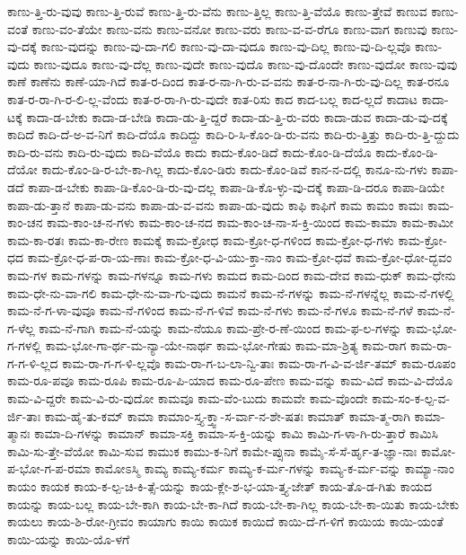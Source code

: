 {ಕಾಣು-ತ್ತಿ-ರು-ವುವು
ಕಾಣು-ತ್ತಿ-ರುವೆ
ಕಾಣು-ತ್ತಿ-ರು-ವೆನು
ಕಾಣು-ತ್ತಿಲ್ಲ
ಕಾಣು-ತ್ತಿ-ವೆಯೊ
ಕಾಣು-ತ್ತೇವೆ
ಕಾಣುವ
ಕಾಣು-ವಂತೆ
ಕಾಣು-ವಂ-ತೆಯೇ
ಕಾಣು-ವನು
ಕಾಣು-ವನೋ
ಕಾಣು-ವರು
ಕಾಣು-ವ-ವ-ರೆಗೂ
ಕಾಣು-ವಾಗ
ಕಾಣುವು
ಕಾಣು-ವು-ದಕ್ಕೆ
ಕಾಣು-ವುದನ್ನು
ಕಾಣು-ವು-ದಾ-ಗಲಿ
ಕಾಣು-ವು-ದಾ-ವುದೂ
ಕಾಣು-ವು-ದಿಲ್ಲ
ಕಾಣು-ವು-ದಿ-ಲ್ಲವೊ
ಕಾಣು-ವುದು
ಕಾಣು-ವುದೂ
ಕಾಣು-ವು-ದೆಲ್ಲ
ಕಾಣು-ವುದೇ
ಕಾಣು-ವುದೊ
ಕಾಣು-ವು-ದೊಂದೇ
ಕಾಣು-ವುದೋ
ಕಾಣು-ವುವು
ಕಾಣೆ
ಕಾಣೆನು
ಕಾಣೆ-ಯಾ-ಗಿದೆ
ಕಾತ-ರ-ದಿಂದ
ಕಾತ-ರ-ನಾ-ಗಿ-ರು-ವ-ವನು
ಕಾತ-ರ-ನಾ-ಗಿ-ರು-ವು-ದಿಲ್ಲ
ಕಾತ-ರನೂ
ಕಾತ-ರ-ರಾ-ಗಿ-ರ-ಲಿ-ಲ್ಲ-ವೆಂದು
ಕಾತ-ರ-ರಾ-ಗಿ-ರು-ವುದೇ
ಕಾತ-ರಿಸು
ಕಾದ
ಕಾದ-ಬಲ್ಲ
ಕಾದ-ಲ್ಲದೆ
ಕಾದಾಟ
ಕಾದಾ-ಟಕ್ಕೆ
ಕಾದಾ-ಡ-ಬೇಕು
ಕಾದಾ-ಡ-ಬೇಡಿ
ಕಾದಾ-ಡು-ತ್ತಿ-ದ್ದರೆ
ಕಾದಾ-ಡು-ತ್ತಿ-ರು-ವರು
ಕಾದಾ-ಡುವ
ಕಾದಾ-ಡು-ವು-ದಕ್ಕೆ
ಕಾದಿದೆ
ಕಾದಿ-ದೆ-ಅ-ವ-ನಿಗೆ
ಕಾದಿ-ದೆಯೊ
ಕಾದಿದ್ದು
ಕಾದಿ-ರಿ-ಸಿ-ಕೊಂ-ಡಿ-ರು-ವನು
ಕಾದಿ-ರು-ತ್ತಿತ್ತು
ಕಾದಿ-ರು-ತ್ತಿ-ದ್ದುದು
ಕಾದಿ-ರು-ವನು
ಕಾದಿ-ರು-ವುದು
ಕಾದಿ-ವೆಯೊ
ಕಾದು
ಕಾದು-ಕೊಂ-ಡಿದೆ
ಕಾದು-ಕೊಂ-ಡಿ-ದೆಯೊ
ಕಾದು-ಕೊಂ-ಡಿ-ದೆಯೋ
ಕಾದು-ಕೊಂ-ಡಿ-ರ-ಬೇ-ಕಾ-ಗಿಲ್ಲ
ಕಾದು-ಕೊಂ-ಡಿರು
ಕಾದು-ಕೊಂ-ಡಿವೆ
ಕಾನ-ನ-ದಲ್ಲಿ
ಕಾನೂ-ನು-ಗಳು
ಕಾಪಾ-ಡದೆ
ಕಾಪಾ-ಡ-ಬೇಕು
ಕಾಪಾ-ಡಿ-ಕೊಂ-ಡಿ-ರು-ವು-ದಲ್ಲ
ಕಾಪಾ-ಡಿ-ಕೊ-ಳ್ಳು-ವು-ದಕ್ಕೆ
ಕಾಪಾ-ಡಿ-ದರೂ
ಕಾಪಾ-ಡಿಯೇ
ಕಾಪಾ-ಡು-ತ್ತಾನೆ
ಕಾಪಾ-ಡು-ವನು
ಕಾಪಾ-ಡು-ವ-ವನು
ಕಾಪಾ-ಡು-ವುದು
ಕಾಫಿ
ಕಾಫಿಗೆ
ಕಾಮ
ಕಾಮಂ
ಕಾಮಃ
ಕಾಮ-ಕಾಂ-ಚನ
ಕಾಮ-ಕಾಂ-ಚ-ನ-ಗಳು
ಕಾಮ-ಕಾಂ-ಚ-ನದ
ಕಾಮ-ಕಾಂ-ಚ-ನಾ-ಸ-ಕ್ತಿ-ಯಿಂದ
ಕಾಮ-ಕಾಮಾ
ಕಾಮ-ಕಾಮೀ
ಕಾಮ-ಕಾ-ರತಃ
ಕಾಮ-ಕಾ-ರೇಣ
ಕಾಮಕ್ಕೆ
ಕಾಮ-ಕ್ರೋಧ
ಕಾಮ-ಕ್ರೋ-ಧ-ಗಳಿಂದ
ಕಾಮ-ಕ್ರೋ-ಧ-ಗಳು
ಕಾಮ-ಕ್ರೋ-ಧದ
ಕಾಮ-ಕ್ರೋ-ಧ-ಪ-ರಾ-ಯ-ಣಾಃ
ಕಾಮ-ಕ್ರೋ-ಧ-ವಿ-ಯು-ಕ್ತಾ-ನಾಂ
ಕಾಮ-ಕ್ರೋ-ಧವೆ
ಕಾಮ-ಕ್ರೋ-ಧೋ-ದ್ಭವಂ
ಕಾಮ-ಗಳ
ಕಾಮ-ಗಳನ್ನು
ಕಾಮ-ಗಳನ್ನೂ
ಕಾಮ-ಗಳು
ಕಾಮದ
ಕಾಮ-ದಿಂದ
ಕಾಮ-ದೇವ
ಕಾಮ-ಧುಕ್
ಕಾಮ-ಧೇನು
ಕಾಮ-ಧೇ-ನು-ವಾ-ಗಲಿ
ಕಾಮ-ಧೇ-ನು-ವಾ-ಗು-ವುದು
ಕಾಮನೆ
ಕಾಮ-ನೆ-ಗಳನ್ನು
ಕಾಮ-ನೆ-ಗಳನ್ನೆಲ್ಲ
ಕಾಮ-ನೆ-ಗಳಲ್ಲಿ
ಕಾಮ-ನೆ-ಗ-ಳಾ-ವುವೂ
ಕಾಮ-ನೆ-ಗಳಿಂದ
ಕಾಮ-ನೆ-ಗ-ಳಿವೆ
ಕಾಮ-ನೆ-ಗಳು
ಕಾಮ-ನೆ-ಗಳೂ
ಕಾಮ-ನೆ-ಗಳೆ
ಕಾಮ-ನೆ-ಗ-ಳೆಲ್ಲ
ಕಾಮ-ನೆ-ಗಾಗಿ
ಕಾಮ-ನೆ-ಯನ್ನು
ಕಾಮ-ನೆಯೂ
ಕಾಮ-ಪ್ರೇ-ರ-ಣೆ-ಯಿಂದ
ಕಾಮ-ಫ-ಲ-ಗಳನ್ನು
ಕಾಮ-ಭೋ-ಗ-ಗಳಲ್ಲಿ
ಕಾಮ-ಭೋ-ಗಾ-ರ್ಥ-ಮ-ನ್ಯಾ-ಯೇ-ನಾರ್ಥ
ಕಾಮ-ಭೋ-ಗೇಷು
ಕಾಮ-ಮಾ-ಶ್ರಿತ್ಯ
ಕಾಮ-ರಾಗ
ಕಾಮ-ರಾ-ಗ-ಗ-ಳಿ-ಲ್ಲದ
ಕಾಮ-ರಾ-ಗ-ಗ-ಳಿ-ಲ್ಲವೊ
ಕಾಮ-ರಾ-ಗ-ಬ-ಲಾ-ನ್ವಿ-ತಾಃ
ಕಾಮ-ರಾ-ಗ-ವಿ-ವ-ರ್ಜಿ-ತಮ್
ಕಾಮ-ರೂಪಂ
ಕಾಮ-ರೂ-ಪವೂ
ಕಾಮ-ರೂಪಿ
ಕಾಮ-ರೂ-ಪಿ-ಯಾದ
ಕಾಮ-ರೂ-ಪೇಣ
ಕಾಮ-ವನ್ನು
ಕಾಮ-ವಿದೆ
ಕಾಮ-ವಿ-ದೆಯೊ
ಕಾಮ-ವಿ-ದ್ದರೇ
ಕಾಮ-ವಿ-ರು-ವುದೋ
ಕಾಮವೂ
ಕಾಮ-ವೆಂ-ಬುದು
ಕಾಮವೇ
ಕಾಮ-ವೊಂದೇ
ಕಾಮ-ಸಂ-ಕ-ಲ್ಪ-ವ-ರ್ಜಿ-ತಾಃ
ಕಾಮ-ಹೈ-ತು-ಕಮ್
ಕಾಮಾ
ಕಾಮಾಂ-ಸ್ತ್ಯ-ಕ್ತ್ವಾ-ಸ-ರ್ವಾ-ನ-ಶೇ-ಷತಃ
ಕಾಮಾತ್
ಕಾಮಾ-ತ್ಮ-ರಾಗಿ
ಕಾಮಾ-ತ್ಮಾನಃ
ಕಾಮಾ-ದಿ-ಗಳನ್ನು
ಕಾಮಾನ್
ಕಾಮಾ-ಸಕ್ತಿ
ಕಾಮಾ-ಸ-ಕ್ತಿ-ಯನ್ನು
ಕಾಮಿ
ಕಾಮಿ-ಗ-ಳಾ-ಗಿ-ರು-ತ್ತಾರೆ
ಕಾಮಿಸಿ
ಕಾಮಿ-ಸು-ತ್ತೇ-ವೆಯೋ
ಕಾಮಿ-ಸುವ
ಕಾಮುಕ
ಕಾಮು-ಕ-ನಿಗೆ
ಕಾಮೇ-ಪ್ಸುನಾ
ಕಾಮೈ-ಸೆ-ಸೆ-ರ್ಹೃ-ತ-ಜ್ಞಾ-ನಾಃ
ಕಾಮೋ-ಪ-ಭೋ-ಗ-ಪ-ರಮಾ
ಕಾಮೋಽಸ್ಮಿ
ಕಾಮ್ಯ
ಕಾಮ್ಯ-ಕರ್ಮ
ಕಾಮ್ಯ-ಕ-ರ್ಮ-ಗಳನ್ನು
ಕಾಮ್ಯ-ಕ-ರ್ಮ-ವನ್ನು
ಕಾಮ್ಯಾ-ನಾಂ
ಕಾಯಂ
ಕಾಯಕ
ಕಾಯ-ಕ-ಲ್ಪ-ಚಿ-ಕಿ-ತ್ಸೆ-ಯನ್ನು
ಕಾಯ-ಕ್ಲೇ-ಶ-ಭ-ಯಾ-ತ್ತ್ಯ-ಜೇತ್
ಕಾಯ-ತೊ-ಡ-ಗಿತು
ಕಾಯದ
ಕಾಯನ್ನು
ಕಾಯ-ಬಲ್ಲ
ಕಾಯ-ಬೇ-ಕಾಗಿ
ಕಾಯ-ಬೇ-ಕಾ-ಗಿದೆ
ಕಾಯ-ಬೇ-ಕಾ-ಗಿಲ್ಲ
ಕಾಯ-ಬೇ-ಕಾ-ಯಿತು
ಕಾಯ-ಬೇಕು
ಕಾಯಲು
ಕಾಯ-ಶಿ-ರೋ-ಗ್ರೀವಂ
ಕಾಯಾಗು
ಕಾಯಿ
ಕಾಯಿಕ
ಕಾಯಿದೆ
ಕಾಯಿ-ದೆ-ಗ-ಳಿಗೆ
ಕಾಯಿಯ
ಕಾಯಿ-ಯಂತೆ
ಕಾಯಿ-ಯನ್ನು
ಕಾಯಿ-ಯೊ-ಳಗೆ
}
